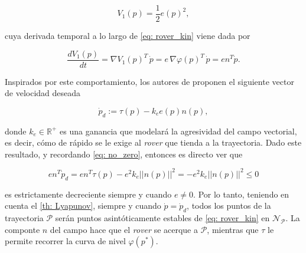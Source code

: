 \begin{equation}
    V_1 (p) = \frac{1}{2} e(p)^2,
\end{equation}

cuya derivada temporal a lo largo de \eqref{eq: rover_kin} viene dada por

\begin{equation}
    \frac{d V_1(p)}{d t} = \nabla V_1(p)^T \, \dot p = e \, \nabla\varphi(p)^T 
 \, \dot p = e n^T \dot p.
\end{equation}

Inspirados por este comportamiento, los autores de \cite{gvf_classic} proponen el siguiente vector de velocidad deseada

\begin{equation}
    \dot p_d := \tau(p) - k_e e(p) n(p),
\end{equation}

donde $k_e \in \mathds{R}^+$ es una ganancia que modelará la agresividad del campo vectorial, es decir, cómo de rápido se le exige al \textit{rover} que tienda a la trayectoria. Dado este resultado, y recordando \eqref{eq: no_zero}, entonces es directo ver que

\begin{equation}
    e n^T \dot p_d = e n^T \tau(p) - e^2 k_e ||n(p)||^2 = - e^2 k_e ||n(p)||^2 \leq 0
\end{equation}

 es estrictamente decreciente siempre y cuando $e \neq 0$. Por lo tanto, teniendo en cuenta el \autoref{th: Lyapunov}, siempre y cuando $\dot p = \dot p_d$, todos los puntos de la trayectoria $\mathcal{P}$ serán puntos asintóticamente estables de \eqref{eq: rover_kin} en $\mathcal{N}_\mathcal{P}$. La componte $n$ del campo hace que el \textit{rover} se acerque a $\mathcal{P}$, mientras que $\tau$ le permite recorrer la curva de nivel $\varphi(p^*)$.